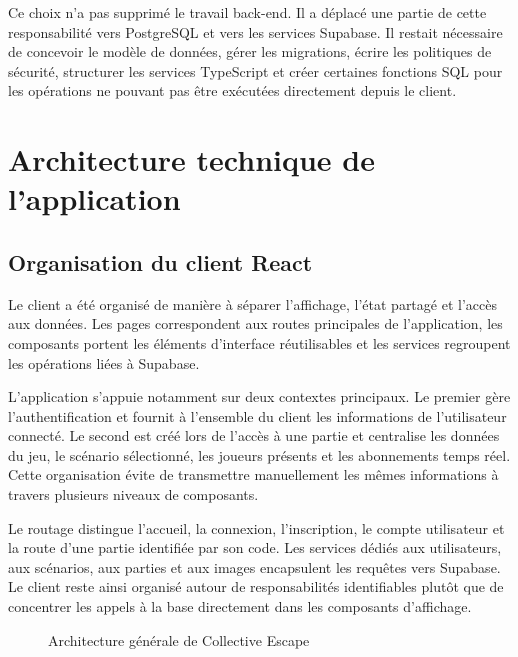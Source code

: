 Ce choix n'a pas supprimé le travail back-end. Il a déplacé une partie de cette responsabilité vers PostgreSQL et vers les services Supabase. Il restait nécessaire de concevoir le modèle de données, gérer les migrations, écrire les politiques de sécurité, structurer les services TypeScript et créer certaines fonctions SQL pour les opérations ne pouvant pas être exécutées directement depuis le client.

\section{Architecture technique de l'application}

\subsection{Organisation du client React}

Le client a été organisé de manière à séparer l'affichage, l'état partagé et l'accès aux données. Les pages correspondent aux routes principales de l'application, les composants portent les éléments d'interface réutilisables et les services regroupent les opérations liées à Supabase.

L'application s'appuie notamment sur deux contextes principaux. Le premier gère l'authentification et fournit à l'ensemble du client les informations de l'utilisateur connecté. Le second est créé lors de l'accès à une partie et centralise les données du jeu, le scénario sélectionné, les joueurs présents et les abonnements temps réel. Cette organisation évite de transmettre manuellement les mêmes informations à travers plusieurs niveaux de composants.

Le routage distingue l'accueil, la connexion, l'inscription, le compte utilisateur et la route d'une partie identifiée par son code. Les services dédiés aux utilisateurs, aux scénarios, aux parties et aux images encapsulent les requêtes vers Supabase. Le client reste ainsi organisé autour de responsabilités identifiables plutôt que de concentrer les appels à la base directement dans les composants d'affichage.

\begin{figure}[H]
\centering
{}
\caption{Architecture générale de Collective Escape}
\label{fig:brise-glace-architecture}
\end{figure}

